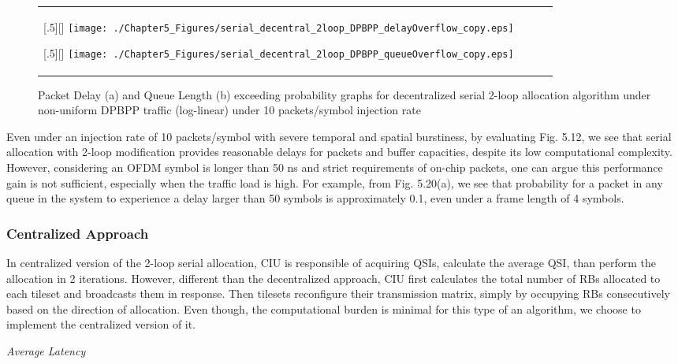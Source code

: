  \begin{figure*}[htbp]
  \centering
  \begin{tabular}[c]{cccc}

  \subcaptionbox{}[.5\linewidth][]{%
    \texttt{[image: ./Chapter5\_Figures/serial\_decentral\_2loop\_DPBPP\_delayOverflow\_copy.eps]} }	
    
  \subcaptionbox{}[.5\linewidth][]{%
    \texttt{[image: ./Chapter5\_Figures/serial\_decentral\_2loop\_DPBPP\_queueOverflow\_copy.eps]}}
 
   \end{tabular}

  \caption{Packet Delay (a) and Queue Length (b) exceeding probability graphs for decentralized serial 2-loop allocation algorithm under non-uniform DPBPP traffic (log-linear) under 10 packets/symbol injection rate}
\end{figure*}

Even under an injection rate of 10 packets/symbol with severe temporal and spatial burstiness, by evaluating Fig. 5.12, we see that serial allocation with 2-loop modification provides reasonable delays for packets and buffer capacities, despite its low computational complexity. However, considering an OFDM symbol is longer than 50 ns and strict requirements of on-chip packets, one can argue this performance gain is not sufficient, especially when the traffic load is high. For example, from Fig. 5.20(a), we see that probability for a packet in any queue in the system to experience a delay larger than 50 symbols is approximately 0.1, even under a frame length of 4 symbols. 

\subsubsection{Centralized Approach}
In centralized version of the 2-loop serial allocation, CIU is responsible of acquiring QSIs, calculate the average QSI, than perform the allocation in 2 iterations. However, different than the decentralized approach, CIU first calculates the total number of RBs allocated to each tileset and broadcasts them in response. Then tilesets reconfigure their transmission matrix, simply by occupying RBs consecutively based on the direction of allocation. Even though, the computational burden is minimal for this type of an algorithm, we choose to implement the centralized version of it.

\textit{Average Latency}


